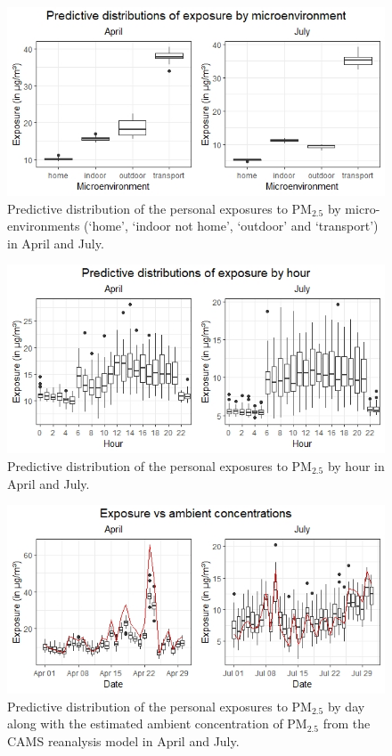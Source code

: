 \documentclass{article}
\begin{document}
\begin{figure}[!hbtp]
	\centering
	\includegraphics[width = \linewidth]{Figures/plot_ME}
	\caption{Predictive distribution of the personal exposures to PM$_{2.5}$ by micro-environments (`home', `indoor not home', `outdoor' and `transport') in April and July.}
	\label{fig::expme}
\end{figure}
\begin{figure}[!hbtp]
	\centering
	\includegraphics[width = \linewidth]{Figures/plot_hour}
	\caption{Predictive distribution of the personal exposures to PM$_{2.5}$ by hour in April and July.}
	\label{fig::exphour}
\end{figure}
\begin{figure}[!hbtp]
	\centering
	\includegraphics[width = \linewidth]{Figures/plot_ambient}
	\caption{Predictive distribution of the personal exposures to PM$_{2.5}$ by day along with the estimated ambient concentration of PM$_{2.5}$ from the CAMS reanalysis model in April and July.}
	\label{fig::expdaily}
\end{figure}
\end{document}
